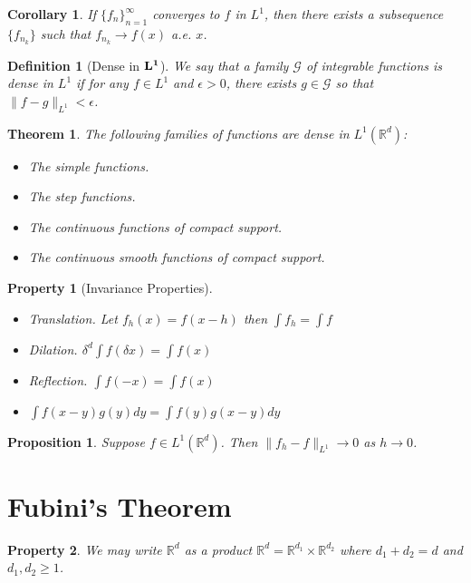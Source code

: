 \documentclass{report}
\theoremstyle{upthm}
\newtheorem{thm}{Theorem}
\newtheorem{defn}{Definition}
\newtheorem{cor}{Corollary}
\newtheorem{prop}{Proposition}
\newtheorem{property}{Property}
\newcommand{\reals}{\mathbb{R}}
\newcommand{\calG}{{\mathcal{G}}}
\newcommand{\set}[1]{\big\lbrace #1 \big\rbrace}
\begin{document}
\begin{cor}
	If $\set{f_n}_{n=1}^{\infty}$ converges to $f$ in $L^1$, then there exists a subsequence $\set{f_{n_k}}$ such that $f_{n_k} \rightarrow f(x)$ a.e. $x$.
\end{cor}

\begin{defn}[Dense in $\bf L^1$]
	We say that a family $\calG$ of integrable functions is dense in $L^1$ if for any
	$f \in L^1$ and $\epsilon > 0$, there exists $g \in \calG$ so that $\|f - g\|_{L^1} <\epsilon $.
\end{defn}

\begin{thm}
	The following families of functions are dense in $L^1(\reals^d)$:
	\begin{itemize}
		\item The simple functions.
		\item The step functions.
		\item  The continuous functions of compact support.
		\item  The continuous smooth functions of compact support.
	\end{itemize}
\end{thm}

\begin{property}[Invariance Properties]\item
	\begin{itemize}
		\item Translation. Let $f_h(x) = f(x - h)$ then $\int f_h = \int f$
		\item Dilation. $\delta^d \int f(\delta x) = \int f(x)$
		\item Reflection. $\int f(-x) = \int f(x)$
		\item $\int f(x-y) g(y) dy= \int f(y) g(x-y) dy$
	\end{itemize}
\end{property}

\begin{prop}
	Suppose $f \in L^1(\reals^d)$. Then $ \| f_h - f \|_{L^1} \rightarrow 0 $ as $h \rightarrow 0$.
\end{prop}

\section{Fubini's Theorem}
\begin{property}
	We may write $\reals^d$ as a product $\reals^d = \reals^{d_1} \times \reals^{d_2}$ where $d_1 + d_2 = d$ and $d_1, d_2 \geq 1$.
\end{property}
\end{document}
